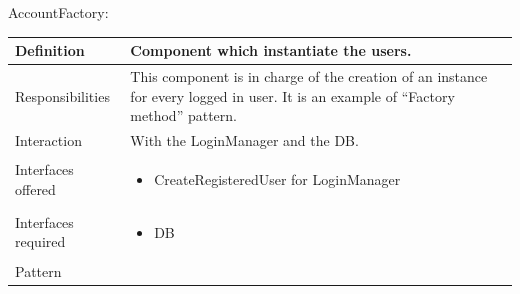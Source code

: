 \documentclass[a4paper,11pt]{report} %
\begin{document}
	\pagebreak
	\centerline{AccountFactory:}
	\begin{center}
		\begin{tabular}{| l | p{9cm} |}\hline
			Definition & Component which instantiate the users.\\\hline
			Responsibilities & This component is in charge of the creation of an instance for every logged in user. It is an example of ``Factory method'' pattern.\\\hline
			Interaction & With the LoginManager and the DB.\\\hline
			Interfaces offered & \begin{itemize}
				\item CreateRegisteredUser for LoginManager
			\end{itemize}\\\hline
			Interfaces required & \begin{itemize}
				\item DB
			\end{itemize}\\\hline
			Pattern & \\\hline
		\end{tabular}
	\end{center}
			
	\pagebreak
\end{document}
